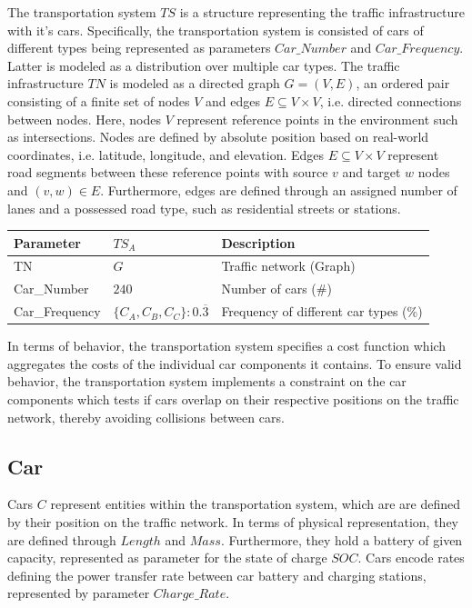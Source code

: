 The transportation system $TS$ is a structure representing the traffic infrastructure with it's cars. Specifically, the transportation system is consisted of cars of different types being represented as parameters $Car\_Number$ and $Car\_Frequency$. Latter is modeled as a distribution over multiple car types. The traffic infrastructure $TN$ is modeled as a directed graph $G = (V,E)$, an ordered pair consisting of a finite set of nodes $V$ and edges $E \subseteq V \times V$, i.e. directed connections between nodes. Here, nodes $V$ represent reference points in the environment such as intersections. Nodes are defined by absolute position based on real-world coordinates, i.e. latitude, longitude, and elevation. Edges $E \subseteq V \times V$ represent road segments between these reference points with source $v$ and target $w$ nodes and $(v,w) \in E$. Furthermore, edges are defined through an assigned number of lanes and a possessed road type, such as residential streets or stations.

\begin{table}[h]
	\renewcommand{\arraystretch}{1.3}
	\centering
	\begin{tabularx}{\columnwidth}{llX}
		\hline
		\textbf{Parameter}     & \textbf{$TS_{A}$}         & \textbf{Description} \\ \hline
		TN              & $G$    & Traffic network (Graph)    \\
		Car\_Number            & $240$    & Number of cars (\#)      \\ 
		Car\_Frequency      & $\{C_{A},C_{B},C_{C}\}:0.\overline{3}$    & Frequency of different car types (\%)       \\ \hline
	\end{tabularx}
\end{table}

In terms of behavior, the transportation system specifies a cost function which aggregates the costs of the individual car components it contains. To ensure valid behavior, the transportation system implements a constraint on the car components which tests if cars overlap on their respective positions on the traffic network, thereby avoiding collisions between cars.

\subsection{Car}

Cars $C$ represent entities within the transportation system, which are are defined by their position on the traffic network. In terms of physical representation, they are defined through $Length$ and $Mass$. Furthermore, they hold a battery of given capacity, represented as parameter for the state of charge $SOC$. Cars encode rates defining the power transfer rate between car battery and charging stations, represented by parameter $Charge\_Rate$.

